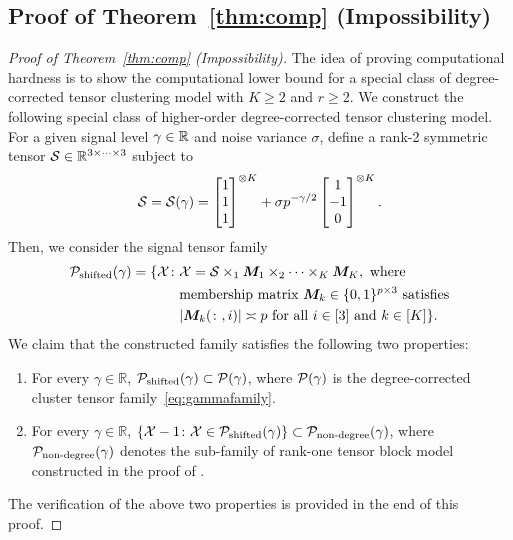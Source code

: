 \documentclass[journal]{IEEEtran}
\theoremstyle{definition}
\theoremstyle{definition}
\begin{document}
\subsection{Proof of Theorem~\ref{thm:comp} (Impossibility)}\label{sec:compprove1}


\begin{proof}[Proof of Theorem~\ref{thm:comp} (Impossibility)]
The idea of proving computational hardness is to show the computational lower bound for a special class of degree-corrected tensor clustering model with $K\geq 2$ {and $ r \geq 2$}. We construct the following special class of higher-order degree-corrected tensor clustering  model. For a given signal level $\gamma\in\mathbb{R}$ and noise variance $\sigma$, define a rank-2 symmetric tensor $\mathcal{S}\in\mathbb{R}^{3\times \cdots\times 3}$ subject to
\begin{equation}\label{eq:S}
\tS=\tS(\gamma) = \begin{bmatrix}
		1\\
		1\\
		1
		\end{bmatrix}^{\otimes K}
+\sigma p^{-\gamma/2} \begin{bmatrix}
		1\\
		-1\\
		0
	\end{bmatrix}^{\otimes K}.
\end{equation}
Then, we consider the signal tensor family
\small
\begin{align}
\mathcal{P}_{\text{shifted}}(\gamma)=\{\mathcal{X}\colon  &\mathcal{X}=\mathcal{S}\times_1\bm M_1\times_2 \cdots \times_K\bm M_K,\ \text{where}  \\
& \text{membership matrix $\bm M_k\in\{0,1\}^{p\times 3}$ satisfies} \\
 &\text{$|\bm M_k(\colon,i)|\asymp p$ for all $i\in[3]$ and $k\in[K]$}\}.\\
\end{align}
\normalsize
We claim that the constructed family satisfies the following two properties:
\begin{enumerate}[wide,label=(\roman*)]
    \item For every $\gamma\in \mathbb{R}$, $\mathcal{P}_{\text{shifted}}(\gamma)\subset \mathcal{P}(\gamma)$, where $\mathcal{P}(\gamma)$ is the degree-corrected cluster tensor family~\eqref{eq:gammafamily}.
    \item For every $\gamma\in \mathbb{R}$, $\{\mathcal{X}-1\colon \mathcal{X}\in \mathcal{P}_{\text{shifted}}(\gamma)\}\subset \mathcal{P}_{\text{non-degree}}(\gamma)$, where $\mathcal{P}_{\text{non-degree}}(\gamma)$ denotes the sub-family of rank-one tensor block model constructed in the proof of \cite[Theorem 7]{han2020exact}. 
\end{enumerate}
The verification of the above two properties is provided in the end of this proof. 


\end{proof}
\end{document}
